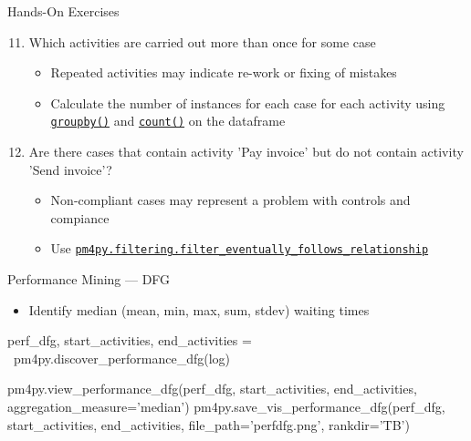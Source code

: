 \documentclass[ignorenonframetext,xcolor=x11names]{beamer}
\begin{document}
\begin{frame}{Hands-On Exercises}
\begin{enumerate}
   \setcounter{enumi}{10}
   \item Which activities are carried out more than once for some case
   \begin{itemize}
       \item Repeated activities may indicate re-work or fixing of mistakes
       \item Calculate the number of instances for each case for each activity using \href{https://pandas.pydata.org/docs/reference/api/pandas.DataFrame.groupby.html}{\texttt{groupby()}} and \href{https://pandas.pydata.org/docs/reference/api/pandas.DataFrame.count.html}{\texttt{count()}} on the dataframe
   \end{itemize}
   \item Are there cases that contain activity 'Pay invoice' but do not contain activity 'Send invoice'?
   \begin{itemize}
      \item Non-compliant cases may represent a problem with controls and compiance
      \item Use \href{https://processintelligence.solutions/static/api/2.7.11/generated/pm4py.filtering.filter_eventually_follows_relation.html}{\texttt{pm4py.filtering.filter\_eventually\_follows\_relationship}}
   \end{itemize}
\end{enumerate}
\end{frame}
   
\begin{frame}[fragile]{Performance Mining --- DFG}
\begin{itemize}
   \item Identify median (mean, min, max, sum, stdev) waiting times
\end{itemize}
\footnotesize
\begin{pythoncode}
perf_dfg, start_activities, end_activities = \
    pm4py.discover_performance_dfg(log)
    
pm4py.view_performance_dfg(perf_dfg, 
    start_activities, end_activities, 
    aggregation_measure='median')
pm4py.save_vis_performance_dfg(perf_dfg, 
    start_activities, end_activities, 
    file_path='perfdfg.png', rankdir='TB')
\end{pythoncode}
\end{frame}
\end{document}
